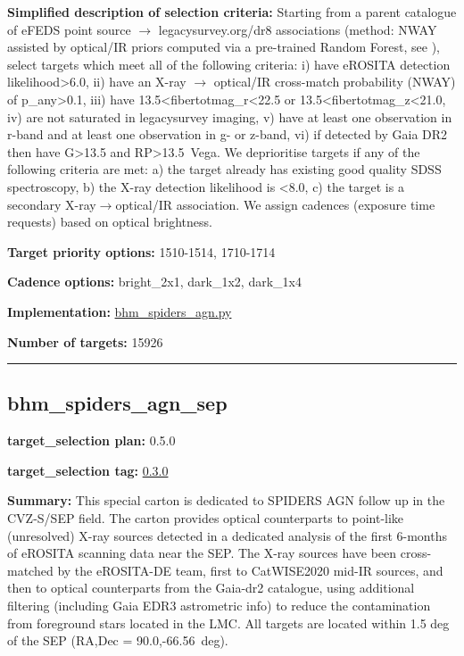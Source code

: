 \noindent\textbf{Simplified description of selection criteria:} Starting from a
parent catalogue of eFEDS point source $\rightarrow$ legacysurvey.org/dr8
associations (method: NWAY assisted by optical/IR priors computed via a
pre-trained Random Forest, see
\citealt{Salvato2022}), select targets which meet all of the following criteria:
i) have eROSITA detection likelihood\textgreater{}6.0, ii) have an X-ray
$\rightarrow$ optical/IR cross-match probability (NWAY) of p\_any\textgreater{}0.1,
iii) have 13.5\textless{}fibertotmag\_r\textless{}22.5 or
13.5\textless{}fibertotmag\_z\textless{}21.0, iv) are not saturated in
legacysurvey imaging, v) have at least one observation in r-band and at
least one observation in g- or z-band, vi) if detected by Gaia DR2 then
have G\textgreater{}13.5 and RP\textgreater{}13.5~Vega. We deprioritise
targets if any of the following criteria are met: a) the target already
has existing good quality SDSS spectroscopy, b) the X-ray detection
likelihood is \textless{}8.0, c) the target is a secondary
X-ray$\rightarrow$optical/IR association. We assign cadences (exposure time
requests) based on optical brightness.


\noindent\textbf{Target priority options:} 1510-1514, 1710-1714

\noindent\textbf{Cadence options:} bright\_2x1, dark\_1x2, dark\_1x4

\noindent\textbf{Implementation:}
\href{https://github.com/sdss/target_selection/blob/0.3.0/python/target_selection/cartons/bhm_spiders_agn.py}{bhm\_spiders\_agn.py}

\noindent\textbf{Number of targets:} 15926

\begin{center}\rule{0.5\linewidth}{0.5pt}\end{center}

\hypertarget{bhm_spiders_agn_sep_plan0.5.0}{%
\subsection{bhm\_spiders\_agn\_sep}\label{bhm_spiders_agn_sep_plan0.5.0}}

\noindent\textbf{target\_selection plan:} 0.5.0

\noindent\textbf{target\_selection tag:}
\href{https://github.com/sdss/target_selection/tree/0.3.0/}{0.3.0}

\noindent\textbf{Summary:} This special carton is dedicated to SPIDERS AGN follow
up in the CVZ-S/SEP field. The carton provides optical counterparts to
point-like (unresolved) X-ray sources detected in a dedicated analysis
of the first 6-months of eROSITA scanning data near the SEP. The X-ray
sources have been cross-matched by the eROSITA-DE team, first to
CatWISE2020 \citep{Marocco2021}
mid-IR sources, and then to optical counterparts from the Gaia-dr2
catalogue, using additional filtering (including Gaia EDR3 astrometric
info) to reduce the contamination from foreground stars located in the
LMC. All targets are located within 1.5 deg of the SEP (RA,Dec =
90.0,-66.56~deg).

